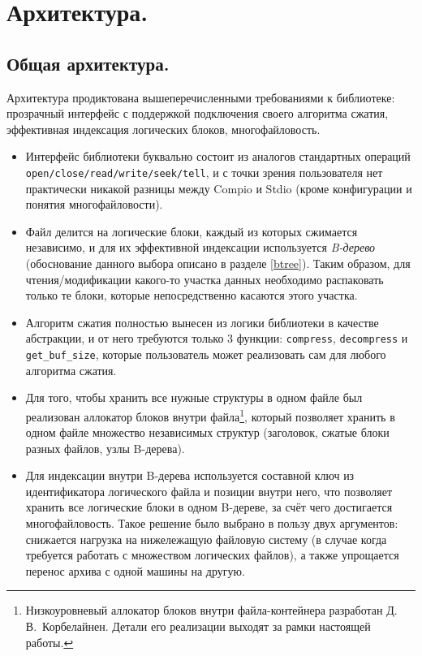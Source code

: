 \section{Архитектура.} \label{architecture}

\subsection{Общая архитектура.}

Архитектура продиктована вышеперечисленными требованиями к библиотеке: прозрачный интерфейс с поддержкой подключения своего алгоритма сжатия, эффективная индексация логических блоков, многофайловость.

\begin{itemize}
    \item Интерфейс библиотеки буквально состоит из аналогов стандартных операций \texttt{open/close/read/write/seek/tell}, и с точки зрения пользователя нет практически никакой разницы между Compio и Stdio (кроме конфигурации и понятия многофайловости).
    \item Файл делится на логические блоки, каждый из которых сжимается независимо, и для их эффективной индексации используется \textit{B-дерево} (обоснование данного выбора описано в разделе \ref{btree}). Таким образом, для чтения/модификации какого-то участка данных необходимо распаковать только те блоки, которые непосредственно касаются этого участка.
    \item Алгоритм сжатия полностью вынесен из логики библиотеки в качестве абстракции, и от него требуются только 3 функции: \texttt{compress}, \texttt{decompress} и \texttt{get\_buf\_size}, которые пользователь может реализовать сам для любого алгоритма сжатия.
    \item Для того, чтобы хранить все нужные структуры в одном файле был реализован аллокатор блоков внутри файла\footnote{Низкоуровневый аллокатор блоков внутри файла-контейнера разработан Д.\,В.~Корбелайнен. Детали его реализации выходят за рамки настоящей работы.}, который позволяет хранить в одном файле множество независимых структур (заголовок, сжатые блоки разных файлов, узлы B-дерева).
    \item Для индексации внутри B-дерева используется составной ключ из идентификатора логического файла и позиции внутри него, что позволяет хранить все логические блоки в одном B-дереве, за счёт чего достигается многофайловость. Такое решение было выбрано в пользу двух аргументов: снижается нагрузка на нижележащую файловую систему (в случае когда требуется работать с множеством логических файлов), а также упрощается перенос архива с одной машины на другую.
\end{itemize}

